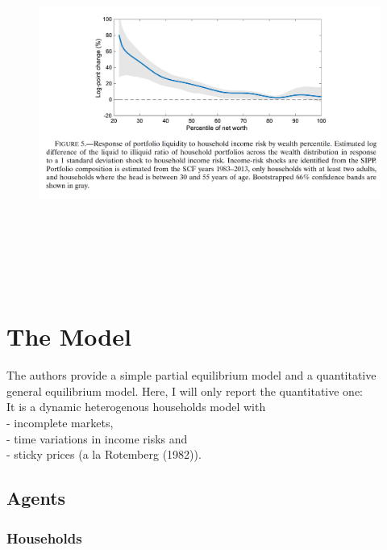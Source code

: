 \documentclass[titlepage]{\econtex}
\begin{document}
\begin{figure}[H]
  \centering
  \includegraphics[width=1\textwidth, height=12cm]{Figure5.png}
  \end{figure}

\hypertarget{The Model}{}
\section{The Model}

The authors provide a simple partial equilibrium model and a quantitative general equilibrium model. Here, I will only report the quantitative one:\\
It is a dynamic heterogenous households model with\\
- incomplete markets,\\
- time variations in income risks and\\
- sticky prices (a la Rotemberg (1982)).
\hypertarget{Agents}{}
\subsection{Agents}

\hypertarget{Households}{}
\subsubsection{Households}
\end{document}
